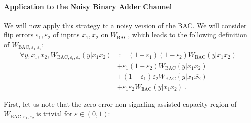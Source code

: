   \paragraph{Application to the Noisy Binary Adder Channel} We will now apply this strategy to a noisy version of the BAC. We will consider flip errors $\varepsilon_1, \varepsilon_2$ of inputs $x_1,x_2$ on $W_{\text{BAC}}$, which leads to the following definition of $W_{\text{BAC},\varepsilon_1, \varepsilon_2}$:
  \begin{equation}
    \begin{aligned}
      \forall y,x_1,x_2, W_{\text{BAC},\varepsilon_1, \varepsilon_2}(y|x_1x_2) &:=  (1-\varepsilon_1)(1-\varepsilon_2) W_{\text{BAC}}(y|x_1x_2)\\
      &+ \varepsilon_1(1-\varepsilon_2) W_{\text{BAC}}(y|\overline{x_1}x_2)\\
      &+ (1-\varepsilon_1)\varepsilon_2 W_{\text{BAC}}(y|x_1\overline{x_2})\\
      &+ \varepsilon_1\varepsilon_2 W_{\text{BAC}}(y|\overline{x_1}\overline{x_2}) \ .
      \end{aligned}
  \end{equation}

  First, let us note that the zero-error non-signaling assisted capacity region of $W_{\text{BAC},\varepsilon_1, \varepsilon_2}$ is trivial for $\varepsilon \in (0,1)$:

